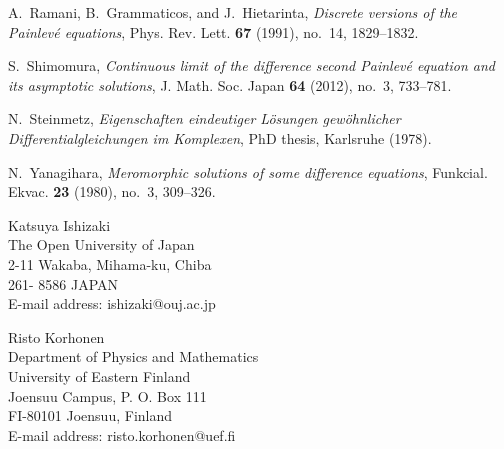 \documentclass{amsart}
\begin{document}
\begin{thebibliography}{10}
A.~Ramani, B.~Grammaticos, and J.~Hietarinta, \emph{Discrete versions of the
  {P}ainlev\'e equations}, Phys. Rev. Lett. \textbf{67} (1991), no.~14,
  1829--1832. 

S.~Shimomura, \emph{Continuous limit of the difference second {P}ainlev\'e
  equation and its asymptotic solutions}, J. Math. Soc. Japan \textbf{64}
  (2012), no.~3, 733--781. 

N.~Steinmetz, \emph{Eigenschaften eindeutiger {L}{\"o}sungen gew{\"o}hnlicher
  {D}ifferentialgleichungen im {K}omplexen}, PhD thesis, Karlsruhe (1978).

N.~Yanagihara, \emph{Meromorphic solutions of some difference equations},
  Funkcial. Ekvac. \textbf{23} (1980), no.~3, 309--326. 

\end{thebibliography}



\vspace{0.5cm}

\noindent
Katsuya Ishizaki\\
The Open University of Japan\\
2-11 Wakaba, Mihama-ku, Chiba\\
261- 8586 JAPAN\\
E-mail address: ishizaki@ouj.ac.jp
\vspace{0.5cm}

\noindent
Risto Korhonen\\
Department of Physics and Mathematics\\
University of Eastern Finland\\
Joensuu Campus, P. O. Box 111\\
FI-80101 Joensuu, Finland\\
E-mail address: risto.korhonen@uef.fi





\end{document}
